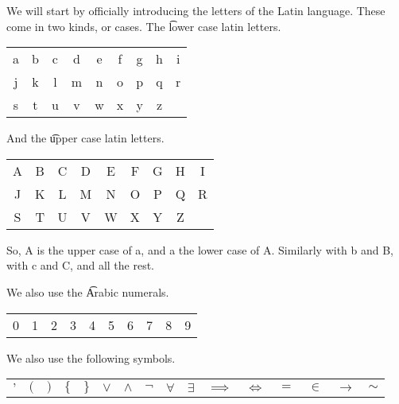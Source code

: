 We will start by officially introducing the letters of the Latin language.
These come in two kinds, or cases.
The \t{lower case latin letters}.
\begin{center}

   \begin{tabular}{ccccccccc}

   a & b & c & d & e & f & g & h & i \\

   j & k & l & m & n & o & p & q & r \\

   s & t & u & v & w & x & y & z & \\

   \end{tabular}

   \end{center}
And the \t{upper case latin letters}.
\begin{center}

\begin{tabular}{ccccccccc}

   A & B & C & D & E & F & G & H & I \\

   J & K & L & M & N & O & P & Q & R \\

   S & T & U & V & W & X & Y & Z & \\

\end{tabular}

\end{center}
So, A is the upper case of a, and a the lower case of A.
Similarly with b and B, with c and C, and all the rest.


We also use the \t{Arabic numerals}.
\begin{center}

   \begin{tabular}{cccccccccc}

   0 & 1 & 2 & 3 & 4 & 5 & 6 & 7 & 8 & 9 \\

   \end{tabular}

   \end{center}


We also use the following symbols.
\begin{center}
     \begin{tabular}{cccccccccccccccc}

   $’$ & $($ & $)$ & $\{$ & $\}$ & $\lor$ & $\land$ &
    $\neg$ & $\forall$ & $\exists$ & $\implies$ & $\iff$ & $=$ & $\in$ & $\to$ &
    $\sim$

   \end{tabular}

   \end{center}
